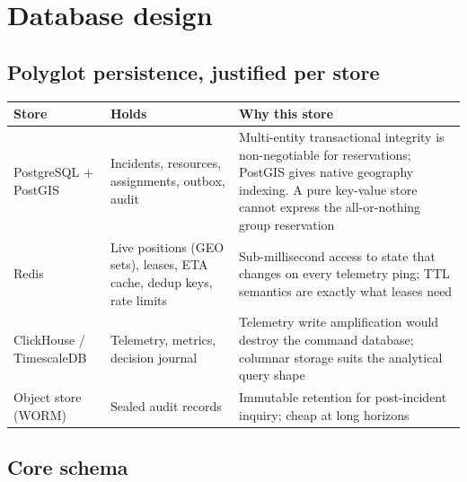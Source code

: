 \section{Database design}

\subsection{Polyglot persistence, justified per store}

\begin{center}\footnotesize
\begin{tabular}{@{}lp{40mm}p{56mm}@{}}
\toprule
\textbf{Store} & \textbf{Holds} & \textbf{Why this store} \\
\midrule
PostgreSQL + PostGIS & Incidents, resources, assignments, outbox, audit & Multi-entity transactional integrity is non-negotiable for reservations; PostGIS gives native geography indexing. A pure key-value store cannot express the all-or-nothing group reservation \\
Redis & Live positions (GEO sets), leases, ETA cache, dedup keys, rate limits & Sub-millisecond access to state that changes on every telemetry ping; TTL semantics are exactly what leases need \\
ClickHouse / TimescaleDB & Telemetry, metrics, decision journal & Telemetry write amplification would destroy the command database; columnar storage suits the analytical query shape \\
Object store (WORM) & Sealed audit records & Immutable retention for post-incident inquiry; cheap at long horizons \\
\bottomrule
\end{tabular}
\end{center}

\subsection{Core schema}

